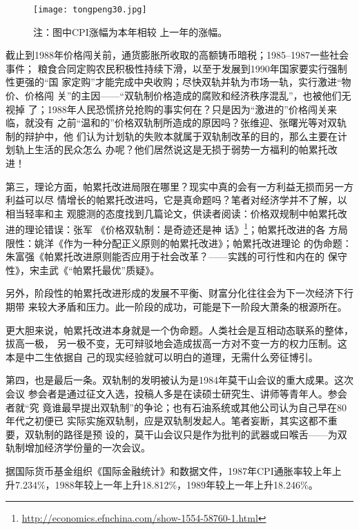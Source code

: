 \begin{figure}[ht]
  \centering
  \texttt{[image: tongpeng30.jpg]}
  \caption[1980--2012年CPI通膨率]{\label{fig:tongpeng30}注：图中CPI涨幅为本年相较
    上一年的涨幅。 }
\end{figure}

截止到1988年价格闯关前，通货膨胀所收取的高额铸币暗税；1985--1987一些社会事件；
粮食合同定购农民积极性持续下滑，以至于发展到1990年国家要实行强制性更强的“国
家定购”才能完成中央收购；尽快双轨并轨为市场一轨，实行激进“物价、价格闯
关”的主因——“双轨制价格造成的腐败和经济秩序混乱”，也被他们无视掉
了；1988年人民恐慌挤兑抢购的事实何在？只是因为“激进的”价格闯关来临，就没有
之前“温和的”价格双轨制所造成的原因吗？张维迎、张曙光等对双轨制的辩护中，他
们认为计划轨的失败本就属于双轨制改革的目的，那么主要在计划轨上生活的民众怎么
办呢？他们居然说这是无损于弱势一方福利的帕累托改进！

第三，理论方面，帕累托改进局限在哪里？现实中真的会有一方利益无损而另一方利益可以尽
情增长的帕累托改进吗，它是真命题吗？笔者对经济学并不了解，以相当轻率和主
观臆测的态度找到几篇论文，供读者阅读：价格双规制中帕累托改进的理论错误：张军
《价格双轨制：是奇迹还是神
话》\footnote{\url{http://economics.efnchina.com/show-1554-58760-1.html}}；帕累托改进的各
方局限性：姚洋《作为一种分配正义原则的帕累托改进》\cite{yaoyang}；帕累托改进理论
的伪命题：朱富强《帕累托改进原则能否应用于社会改革？——实践的可行性和内在的
保守性》\cite{zhufuqiang}，宋圭武《“帕累托最优”质疑》\cite{songguiwu}。

另外，阶段性的帕累托改进形成的发展不平衡、财富分化往往会为下一次经济下行期带
来较大矛盾和压力。此一阶段的成功，可能是下一阶段大萧条的根源所在。

更大胆来说，帕累托改进本身就是一个伪命题。人类社会是互相动态联系的整体，拔高一极，
另一极不变，无可辩驳地会造成拔高一方对不变一方的权力压制。这本是中二生依据自
己的现实经验就可以明白的道理，无需什么旁征博引。

第四，也是最后一条。双轨制的发明被认为是1984年莫干山会议的重大成果。这次会议
参会者是通过征文入选，投稿人多是在读硕士研究生、讲师等青年人。参会者就“究
竟谁最早提出双轨制”的争论；也有石油系统或其他公司认为自己早在80年代之初便已
实际实施双轨制，应是双轨制发起人。笔者妄断，其实这都不重要，双轨制的路径是预
设的，莫干山会议只是作为批判的武器或曰喉舌——为双轨制增加经济学份量的一次会议。


据国际货币基金组织《国际金融统计》和数据文件，1987年CPI通胀率较上年上
升7.234\%，1988年较上一年上升18.812\%，1989年较上一年上升18.246\%。


